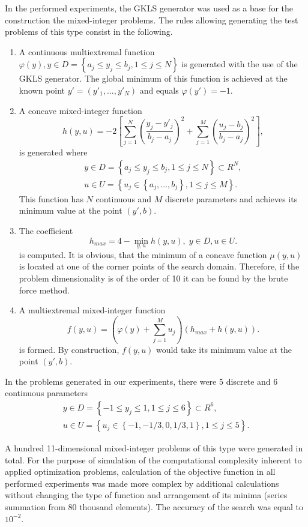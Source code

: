 \documentclass{llncs}
\begin{document}
In the performed experiments, the GKLS generator was used as a base for the construction the 
mixed-integer problems. The rules allowing generating the test problems of this type consist in 
the following.

\begin{enumerate}
	\item A continuous multiextremal function $\varphi(y), y\in D = \left\{ a_j\leq 
y_j\leq b_j, 1\leq j \leq N \right\}$ is generated with the use of the GKLS generator. The global 
minimum of this function is achieved at the known point $y'=(y'_1,...,y'_N)$ and equals 
$\varphi(y')=-1$.
	\item A concave mixed-integer function 
	\[
			h(y,u) = -2 \left[ \sum_{j=1}^N \left( \frac{y_j - y'_j}{b_j-a_j} 
\right)^2 + \sum_{j=1}^M \left( \frac{u_j - b_j}{b_j-a_j} \right)^2 \right],
	\]
	is generated where 
	\begin{gather}
	y\in D = \left\{ a_j\leq y_j\leq b_j, 1\leq j \leq N \right\} \subset R^N,\nonumber \\
	u\in U = \left\{ u_j \in  \left\{a_j, ..., b_j \right\}, 1\leq j \leq M \right\}.\nonumber
	\end{gather}
	This function has $N$ continuous and $M$ discrete parameters and achieves its 
minimum value at the point $(y',b)$.
	\item The coefficient 
	\[
	h_{max} = 4 - \min_{y,u} h(y,u) , \; y\in D, u \in U.
	\]
	is computed. 
It is obvious, that the minimum of a concave function $\mu(y,u)$ is located at one of the corner 
points of the search domain. Therefore, if the problem dimensionality is of the order of 10 it can 
be found by the brute force method.
	\item A multiextremal mixed-integer function 
	\[
	f(y,u) = \left(\varphi(y) + \sum_{j=1}^M{u_j}\right)\left(h_{max} + h(y,u)\right).
	\]
	is formed.
By construction, $f(y,u)$ would take its minimum value at the point $(y',b)$.
	
\end{enumerate}


In the problems generated in our experiments, there were 5 discrete and 6 continuous 
parameters 
	\begin{gather}
	y\in D = \left\{ -1 \leq y_j\leq 1, 1\leq j \leq 6 \right\} \subset R^6,\nonumber \\
	u\in U = \left\{ u_j \in  \left\{-1, -1/3, 0, 1/3, 1 \right\}, 1\leq j \leq 5 \right\}.\nonumber
	\end{gather}

A hundred 11-dimensional mixed-integer problems of this type were generated in total. 
For the purpose of simulation of the computational complexity inherent to
applied optimization problems, calculation of the objective function in all performed
experiments was made more complex by additional calculations without changing the type
of function and arrangement of its minima (series summation from 80 thousand elements).
The accuracy of the search was equal to $10^{-2}$.%
\end{document}
